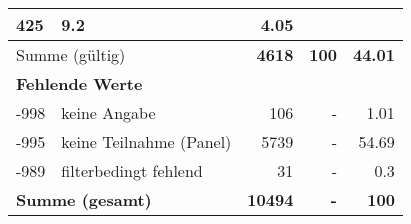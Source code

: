 \begin{longtable}{lXrrr}
       \num{425} &
       \num[round-mode=places,round-precision=2]{9,2} &
         \num[round-mode=places,round-precision=2]{4,05} \\
     \midrule
     \multicolumn{2}{l}{Summe (gültig)} &
       \textbf{\num{4618}} &
     \textbf{100} &
       \textbf{\num[round-mode=places,round-precision=2]{44,01}} \\
     \multicolumn{5}{l}{\textbf{Fehlende Werte}}\\
       -998 &
       keine Angabe &
         \num{106} &
        - &
         \num[round-mode=places,round-precision=2]{1,01} \\
       -995 &
       keine Teilnahme (Panel) &
         \num{5739} &
        - &
         \num[round-mode=places,round-precision=2]{54,69} \\
       -989 &
       filterbedingt fehlend &
         \num{31} &
        - &
         \num[round-mode=places,round-precision=2]{0,3} \\
     \midrule
     \multicolumn{2}{l}{\textbf{Summe (gesamt)}} &
          \textbf{\num{10494}} &
        \textbf{-} &
        \textbf{100} \\
     \bottomrule
     \end{longtable}
     
